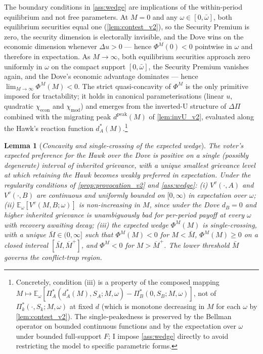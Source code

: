 \documentclass[11pt,twoside]{extarticle}
\newtheorem{lemma}{Lemma}
\begin{document}
The boundary conditions in \autoref{ass:wedge} are implications of the within-period equilibrium and not free parameters. At $M=0$ and any $\omega\in[0,\bar\omega]$, both equilibrium securities equal one (\autoref{lem:contest_v2}), so the Security Premium is zero, the security dimension is electorally invisible, and the Dove wins on the economic dimension whenever $\Delta u>0$ — hence $\Phi^M(0)<0$ pointwise in $\omega$ and therefore in expectation. As $M\to\infty$, both equilibrium securities approach zero uniformly in $\omega$ on the compact support $[0,\bar\omega]$, the Security Premium vanishes again, and the Dove's economic advantage dominates — hence $\lim_{M\to\infty}\Phi^M(M)<0$. The strict quasi-concavity of $\Phi^M$ is the only primitive imposed for tractability; it holds in canonical parameterisations (linear $u$, quadratic $\chi_{\mathrm{econ}}$ and $\chi_{\mathrm{mod}}$) and emerges from the inverted-U structure of $\Delta\Pi$ combined with the migrating peak $d^{\mathrm{peak}}(M)$ of \autoref{lem:invU_v2}, evaluated along the Hawk's reaction function $d_A^*(M)$.\footnote{Concretely, condition (iii) is a property of the composed mapping $M\mapsto\mathbb{E}_\omega[\Pi_A^*(d_A^*(M),S_A;M,\omega)-\Pi_B^*(0,S_B;M,\omega)]$, not of $\Pi_k^*(\cdot,S_k;M,\omega)$ at fixed $d$ (which is monotone decreasing in $M$ for each $\omega$ by \autoref{lem:contest_v2}). The single-peakedness is preserved by the Bellman operator on bounded continuous functions and by the expectation over $\omega$ under bounded full-support $F$; I impose \autoref{ass:wedge} directly to avoid restricting the model to specific parametric forms.}

\begin{lemma}[\emph{Concavity and single-crossing of the expected wedge}]\label{lem:wedge_v2}
\emph{The voter's expected preference for the Hawk over the Dove is positive on a single (possibly degenerate) interval of inherited grievance, with a unique smallest grievance level at which retaining the Hawk becomes weakly preferred in expectation.}
Under the regularity conditions of \autoref{prop:provocation_v2} and \autoref{ass:wedge}: (i) $V^v(\cdot,A)$ and $V^v(\cdot,B)$ are continuous and uniformly bounded on $[0,\infty)$ in expectation over $\omega$; (ii) $\mathbb{E}_\omega[V^v(M,B;\omega)]$ is non-increasing in $M$, since under the Dove $d_B=0$ and higher inherited grievance is unambiguously bad for per-period payoff at every $\omega$ with recovery awaiting decay; (iii) the expected wedge $\Phi^M(M)$ is single-crossing, with a unique $\bar M\in(0,\infty]$ such that $\Phi^M(M)<0$ for $M<\bar M$, $\Phi^M(M)\ge 0$ on a closed interval $[\bar M,\overline M^+]$, and $\Phi^M<0$ for $M>\overline M^+$. The lower threshold $\bar M$ governs the conflict-trap region.
\end{lemma}
\end{document}
